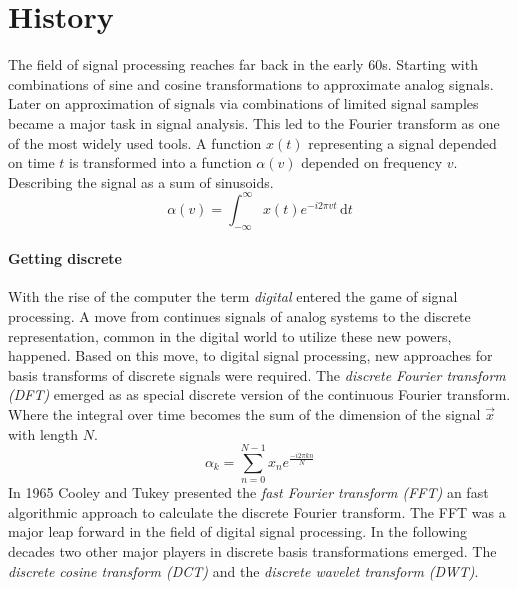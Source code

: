 \section{History}
\label{sec:history}
The field of signal processing reaches far back in the early 60s.
Starting with combinations of sine and cosine transformations to approximate
analog signals. 
Later on approximation of signals via combinations of limited signal samples
became a major task in signal analysis. This led to the Fourier transform as one
of the most widely used tools. A function $x(t)$ representing a signal depended
on time $t$ is transformed into a function   $\alpha(v)$  depended on frequency
$v$. Describing the signal as a sum of sinusoids. 
\begin{equation*}
\alpha\left(v\right) = \int_{-\infty}^{\infty} \! x(t)e^{-i2\pi
v t} \,
\mathrm{d}t
\end{equation*}

\paragraph{Getting discrete}
With the rise of the computer the term \emph{digital} entered the
game of signal processing. A move from continues signals of analog systems to
the discrete representation, common in the digital world to utilize these new
powers, happened. Based on this move, to digital signal processing, new
approaches for basis transforms of discrete signals were required. The
\emph{discrete Fourier transform (DFT)} emerged as as special discrete version
of the continuous
Fourier transform. Where the integral over time becomes the sum of the dimension
of the signal $\vec{x}$ with length $N$. 
\begin{equation}
 \alpha_k = \sum_{n=0}^{N-1}x_ne^{\frac{-i2\pi kn}{N}}
\end{equation}
In 1965 Cooley and Tukey presented\cite{Cooley1965} the \emph{fast Fourier
transform (FFT)} an fast algorithmic approach to calculate the discrete
Fourier transform. The FFT was a major leap forward in the field of digital
signal processing. 
In the following decades two other major players in discrete basis
transformations emerged. The \emph{discrete cosine transform (DCT)} and the
\emph{discrete wavelet transform (DWT)}. 

